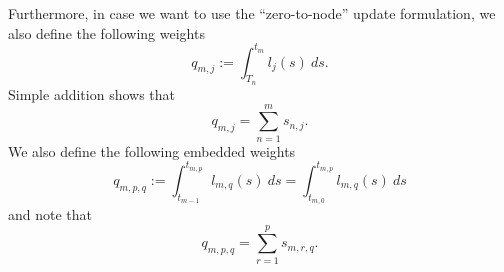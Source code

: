 \documentclass{article}
\begin{document}
Furthermore, in case we want to use the ``zero-to-node'' update formulation, we also define the following weights
\begin{equation}
	q_{m,j} := \int_{T_{n}}^{t_m} l_j(s)~ds.
\end{equation}
Simple addition shows that
\begin{equation}
	q_{m,j} = \sum_{n=1}^{m} s_{n,j}.
\end{equation}
We also define the following embedded weights
\begin{equation}
	q_{m,p,q} := \int_{t_{m-1}}^{t_{m,p}} l_{m,q}(s)~ds = \int_{t_{m,0}}^{t_{m,p}} l_{m,q}(s)~ds
\end{equation}
and note that
\begin{equation}
	q_{m,p,q} = \sum_{r=1}^{p} s_{m,r,q}.
\end{equation}
%
%
\end{document}
